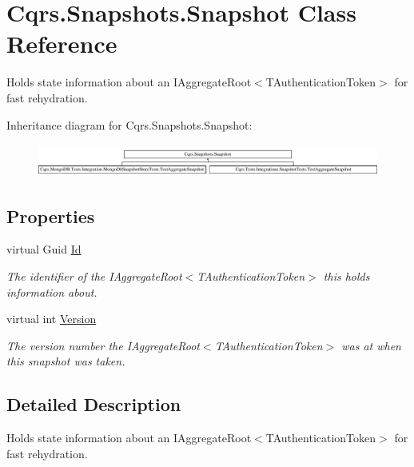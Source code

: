 \hypertarget{classCqrs_1_1Snapshots_1_1Snapshot}{}\section{Cqrs.\+Snapshots.\+Snapshot Class Reference}
\label{classCqrs_1_1Snapshots_1_1Snapshot}


Holds state information about an I\+Aggregate\+Root$<$\+T\+Authentication\+Token$>$ for fast rehydration.  


Inheritance diagram for Cqrs.\+Snapshots.\+Snapshot\+:\begin{figure}[H]
\begin{center}
\leavevmode
\includegraphics[height=1.098039cm]{classCqrs_1_1Snapshots_1_1Snapshot}
\end{center}
\end{figure}
\subsection*{Properties}
\begin{DoxyCompactItemize}
\item 
virtual Guid \hyperlink{classCqrs_1_1Snapshots_1_1Snapshot_a0da54bdfa43e46a17f6e6aa88d1f3b67_a0da54bdfa43e46a17f6e6aa88d1f3b67}{Id}
\begin{DoxyCompactList}\small\item\em The identifier of the I\+Aggregate\+Root$<$\+T\+Authentication\+Token$>$ this holds information about. \end{DoxyCompactList}\item 
virtual int \hyperlink{classCqrs_1_1Snapshots_1_1Snapshot_a59c0a399430e5f4a1b27d999c3bb5d4f_a59c0a399430e5f4a1b27d999c3bb5d4f}{Version}
\begin{DoxyCompactList}\small\item\em The version number the I\+Aggregate\+Root$<$\+T\+Authentication\+Token$>$ was at when this snapshot was taken. \end{DoxyCompactList}\end{DoxyCompactItemize}


\subsection{Detailed Description}
Holds state information about an I\+Aggregate\+Root$<$\+T\+Authentication\+Token$>$ for fast rehydration. 



